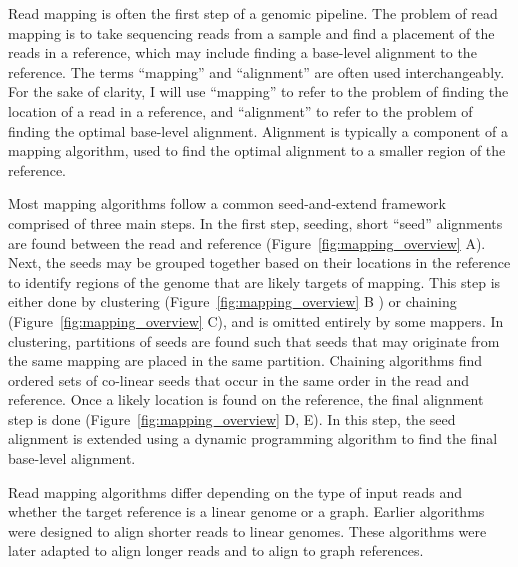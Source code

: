 \documentclass[11pt]{ucscthesis}
\begin{document}
Read mapping is often the first step of a genomic pipeline.
The problem of read mapping is to take sequencing reads from a sample and find a placement of the reads in a reference, which may include finding a base-level alignment to the reference.
The terms ``mapping'' and ``alignment'' are often used interchangeably.
For the sake of clarity, I will use ``mapping'' to refer to the problem of finding the location of a read in a reference, and ``alignment'' to refer to the problem of finding the optimal base-level alignment.
Alignment is typically a component of a mapping algorithm, used to find the optimal alignment to a smaller region of the reference.

Most mapping algorithms follow a common seed-and-extend framework comprised of three main steps.
In the first step, seeding, short ``seed'' alignments are found between the read and reference (Figure~\ref{fig:mapping_overview} A).
Next, the seeds may be grouped together based on their locations in the reference to identify regions of the genome that are likely targets of mapping.
This step is either done by clustering  (Figure~\ref{fig:mapping_overview} B ) or chaining  (Figure~\ref{fig:mapping_overview} C), and is omitted entirely by some mappers.
In clustering, partitions of seeds are found such that seeds that may originate from the same mapping are placed in the same partition.
Chaining algorithms find ordered sets of co-linear seeds that occur in the same order in the read and reference. 
Once a likely location is found on the reference, the final alignment step is done (Figure~\ref{fig:mapping_overview} D, E).
In this step, the seed alignment is extended using a dynamic programming algorithm to find the final base-level alignment.

Read mapping algorithms differ depending on the type of input reads and whether the target reference is a linear genome or a graph.
Earlier algorithms were designed to align shorter reads to linear genomes.
These algorithms were later adapted to align longer reads and to align to graph references.
\end{document}
